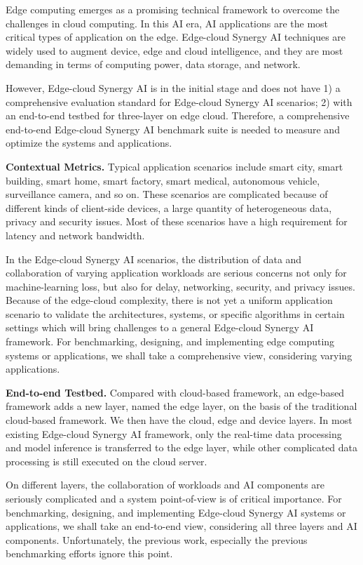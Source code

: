 Edge computing emerges as a promising technical framework to overcome the challenges in cloud computing. In this AI era, AI applications are the most critical types of application on the edge. Edge-cloud Synergy AI techniques are widely used to augment device, edge and cloud intelligence, and they are most demanding in terms of computing power, data storage, and network. 

However, Edge-cloud Synergy AI is in the initial stage and does not have 1) a comprehensive evaluation standard for Edge-cloud Synergy AI scenarios; 2) with an end-to-end testbed for three-layer on edge cloud. Therefore, a comprehensive end-to-end Edge-cloud Synergy AI benchmark suite is needed to measure and optimize the systems and applications.

\textbf{Contextual Metrics.} Typical application scenarios include smart city, smart building, smart home, smart factory, smart medical, autonomous vehicle, surveillance camera, and so on. These scenarios are complicated because of different kinds of client-side devices, a large quantity of heterogeneous data, privacy and security issues. Most of these scenarios have a high requirement for latency and network bandwidth. 

In the Edge-cloud Synergy AI scenarios, the distribution of data and collaboration of varying application workloads are serious concerns not only for machine-learning loss, but also for delay, networking, security, and privacy issues. Because of the edge-cloud complexity, there is not yet a uniform application scenario to validate the architectures, systems, or specific algorithms in certain settings which will bring challenges to a general Edge-cloud Synergy AI framework. For benchmarking, designing, and implementing edge computing systems or applications, we shall take a comprehensive view, considering varying applications. 

\textbf{End-to-end Testbed.} Compared with cloud-based framework, an edge-based framework adds a new layer, named the edge layer, on the basis of the traditional cloud-based framework. We then have the cloud, edge and device layers. In most existing Edge-cloud Synergy AI framework, only the real-time data processing and model inference is transferred to the edge layer, while other complicated data processing is still executed on the cloud server.

On different layers, the collaboration of workloads and AI components are seriously complicated and a system point-of-view is of critical importance. For benchmarking, designing, and implementing Edge-cloud Synergy AI systems or applications, we shall take an end-to-end view, considering all three layers and AI components. Unfortunately, the previous work, especially the previous benchmarking efforts ignore this point.

